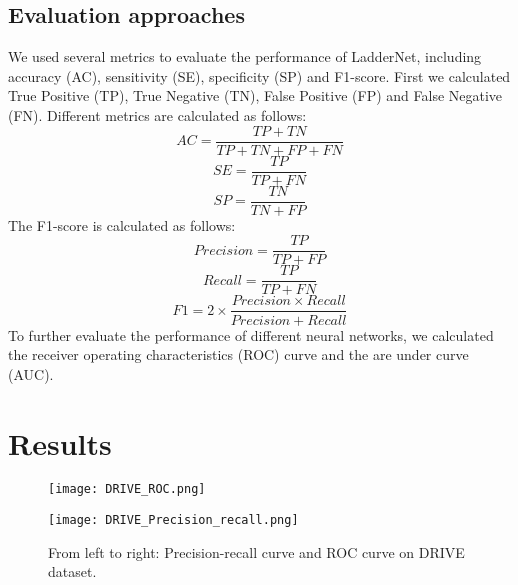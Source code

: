 \documentclass{article}
\begin{document}
\subsection{Evaluation approaches}
We used several metrics to evaluate the performance of LadderNet, including accuracy (AC), sensitivity (SE), specificity (SP) and F1-score. First we calculated True Positive (TP), True Negative (TN), False Positive (FP) and False Negative (FN). Different metrics are calculated as follows:
\begin{equation}
AC = \frac{TP+TN}{TP+TN+FP+FN}
\end{equation}
\begin{equation}
SE=\frac{TP}{TP+FN}
\end{equation}
\begin{equation}
SP=\frac{TN}{TN+FP}
\end{equation}
The F1-score is calculated as follows:
\begin{equation}
Precision = \frac{TP}{TP+FP}
\end{equation}
\begin{equation}
Recall = \frac{TP}{TP+FN}
\end{equation}
\begin{equation}
F1 = 2 \times \frac{Precision \times Recall}{Precision + Recall}
\end{equation}
To further evaluate the performance of different neural networks, we calculated the receiver operating characteristics (ROC) curve and the are under curve (AUC). 
\section{Results}

\begin{figure}[!htb]
    \centering
    \begin{minipage}{.25\textwidth}
        \centering
        \texttt{[image: DRIVE\_ROC.png]}
    \end{minipage}\begin{minipage}{0.25\textwidth}
        \centering
        \texttt{[image: DRIVE\_Precision\_recall.png]}
    \end{minipage}
    \caption{
    \footnotesize{From left to right: Precision-recall curve and ROC curve on DRIVE dataset.}
    }
    \label{DRIVEROC}
\end{figure} 
\end{document}
